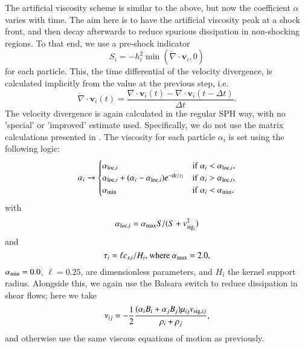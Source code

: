 The artificial viscosity scheme is similar to the above, but now the
coefficient $\alpha$ varies with time. The aim here is to have the artificial
viscosity peak at a shock front, and then decay afterwards to reduce spurious
dissipation in non-shocking regions. To that end, we use a pre-shock
indicator
\begin{equation}
    S_i = - h_i^2 \min(\dot{\nabla} \cdot \mathbf{v}_i, 0)
\end{equation}
for each particle. This, the time differential of the velocity divergence,
is calculated implicitly from the value at the previous step, i.e.
\begin{equation}
    \dot{\nabla} \cdot \mathbf{v}_i(t) = \frac{
        \nabla \cdot \mathbf{v}_i(t) - \nabla \cdot \mathbf{v}_i(t - \Delta t)
    }{\Delta t}.
\end{equation}
The velocity divergence is again calculated in the regular SPH way, with no
'special' or 'improved' estimate used. Specifically, we do not use the matrix
calculations presented in \citet{Cullen2010}. The viscosity for each particle
$\alpha_i$ is set using the following logic:
\begin{equation}
    \alpha_i \rightarrow \begin{cases}
       \alpha_{{\rm loc}, i} & {\rm if}~ \alpha_i < \alpha_{{\rm loc}, i}, \\
       \alpha_{{\rm loc}, i} + (\alpha_i - \alpha_{{\rm loc}, i})e^{-\mathrm{d}t/\tau_i} & {\rm if}~ \alpha_i > \alpha_{{\rm loc}, i},\\
       \alpha_{{\rm min}} & {\rm if}~ \alpha_i < \alpha_{\rm min},
    \end{cases}
\end{equation}
with
\begin{equation}
    \alpha_{{\rm loc}, i} = \alpha_{\rm max} S / (S + v_{{\rm sig}_i}^2)
\end{equation}
and 
\begin{equation}
    \tau_i = \ell c_{s, i}/{H_i}$, where $\alpha_{\rm max} = 2.0,
\end{equation}
$\alpha_{\rm min} = 0.0$, $\ell = 0.25$, are dimensionless parameters, and $H_i$
the kernel support radius. Alongside this, we again use the Balsara switch to
reduce dissipation in shear flows; here we take 
\begin{equation}
    \nu_{ij} = - \frac{1}{2}
        \frac{(\alpha_i B_i + \alpha_j B_j) \mu_{ij} v_{{\rm sig}, ij}}{\rho_i + \rho_j},
\end{equation}
and otherwise use the same viscous equations of motion as previously.

